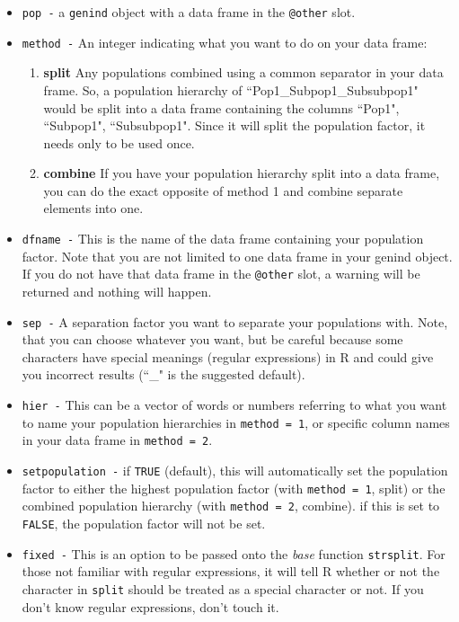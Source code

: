 \documentclass[letterpaper]{article}\usepackage[]{graphicx}\usepackage[]{color}
\begin{document}
\begin{itemize}
  \item \texttt{pop -} a \texttt{genind} object with a data frame in the \texttt{@other} slot.
  \item \texttt{method -} An integer indicating what you want to do on your data frame:
  \begin{enumerate}
    \item \textbf{split} Any populations combined using a common separator in your data frame. So, a population hierarchy of ``Pop1\_Subpop1\_Subsubpop1" would be split into a data frame containing the columns ``Pop1", ``Subpop1", ``Subsubpop1". Since it will split the population factor, it needs only to be used once. 
    \item \textbf{combine} If you have your population hierarchy split into a data frame, you can do the exact opposite of method 1 and combine separate elements into one.
  \end{enumerate}
  \item \texttt{dfname -} This is the name of the data frame containing your population factor. Note that you are not limited to one data frame in your genind object. If you do not have that data frame in the \texttt{@other} slot, a warning will be returned and nothing will happen.
  \item \texttt{sep -} A separation factor you want to separate your populations with. Note, that you can choose whatever you want, but be careful because some characters have special meanings (regular expressions) in R and could give you incorrect results (``\_" is the suggested default).
  \item \texttt{hier -} This can be a vector of words or numbers referring to what you want to name your population hierarchies in \texttt{method = 1}, or specific column names in your data frame in \texttt{method = 2}. 
  \item \texttt{setpopulation -} if \texttt{TRUE} (default), this will automatically set the population factor to either the highest population factor (with \texttt{method = 1}, split) or the combined population hierarchy (with \texttt{method = 2}, combine). if this is set to \texttt{FALSE}, the population factor will not be set.
  \item \texttt{fixed -} This is an option to be passed onto the \textit{base} function \texttt{strsplit}. For those not familiar with regular expressions, it will tell R whether or not the character in \texttt{split} should be treated as a special character or not. If you don't know regular expressions, don't touch it.
\end{itemize}
\end{document}
